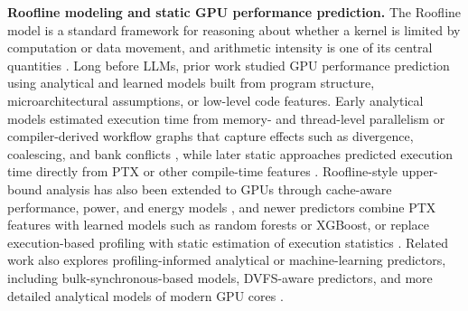 \textbf{Roofline modeling and static GPU performance prediction.}
The Roofline model is a standard framework for reasoning about whether a kernel is limited by computation or data movement, and arithmetic intensity is one of its central quantities \cite{samuelwilliamsRooflineInsightfulVisual2009}.
Long before LLMs, prior work studied GPU performance prediction using analytical and learned models built from program structure, microarchitectural assumptions, or low-level code features.
Early analytical models estimated execution time from memory- and thread-level parallelism or compiler-derived workflow graphs that capture effects such as divergence, coalescing, and bank conflicts \cite{hongAnalyticalModelGPU2009,baghsorkhiAdaptivePerformanceModeling2010}, while later static approaches predicted execution time directly from PTX or other compile-time features \cite{limAutotuningGPUKernels2017,alavaniPredictingExecutionTime2018,guerreiroGPUStaticModeling2019a}.
Roofline-style upper-bound analysis has also been extended to GPUs through cache-aware performance, power, and energy models \cite{lopesExploringGPUPerformance2017}, and newer predictors combine PTX features with learned models such as random forests or XGBoost, or replace execution-based profiling with static estimation of execution statistics \cite{braunSimpleModelPortable2021,emondsCUDAsapStaticallyDeterminedExecution2023,tranAccurateLatencyPredictor2025}.
Related work also explores profiling-informed analytical or machine-learning predictors, including bulk-synchronous-based models, DVFS-aware predictors, and more detailed analytical models of modern GPU cores \cite{amarisComparisonGPUExecution2016,wangGPGPUPerformanceEstimation2020,leeGCoMDetailedGPU2022}.
